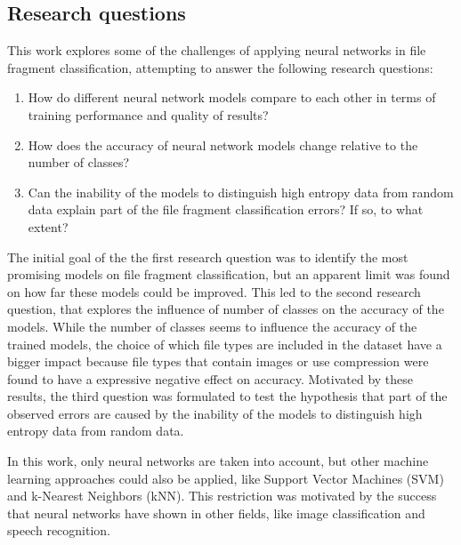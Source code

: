 \subsection{Research questions}
This work explores some of the challenges of applying neural networks in file fragment classification, attempting to answer the following research questions:

\begin{enumerate}[itemindent=\parindent,label=\textbf{Q\arabic*.}]

    \item How do different neural network models compare to each other in terms of training performance and quality of results?
    
    \item How does the accuracy of neural network models change relative to the number of classes?

    \item Can the inability of the models to distinguish high entropy data from random data explain part of the file fragment classification errors? If so, to what extent?
\end{enumerate}

The initial goal of the the first research question was to identify the most promising models on file fragment classification, but an apparent limit was found on how far these models could be improved.
This led to the second research question, that explores the influence of number of classes on the accuracy of the models. While the number of classes seems to influence the accuracy of the trained models, the choice of which file types are included in the dataset have a bigger impact because file types that contain images or use compression were found to have a expressive negative effect on accuracy.
Motivated by these results, the third question was formulated to test the hypothesis that part of the observed errors are caused by the inability of the models to distinguish high entropy data from random data.

In this work, only neural networks are taken into account, but other machine learning approaches could also be applied, like Support Vector Machines (SVM) and k-Nearest Neighbors (kNN). This restriction was motivated by the success that neural networks have shown in other fields, like image classification and speech recognition.
